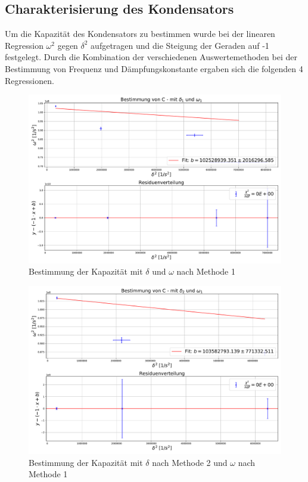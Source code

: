 \documentclass[a4paper, 11pt]{article}
\begin{document}
\subsection{Charakterisierung des Kondensators}
Um die Kapazität des Kondensators zu bestimmen wurde bei der linearen Regression $\omega^2$ gegen $\delta^2$ aufgetragen und die Steigung der Geraden auf -1 festgelegt. Durch die Kombination der verschiedenen Auswertemethoden bei der Bestimmung von Frequenz und Dämpfungskonstante ergaben sich die folgenden 4 Regressionen.

\begin{figure}[H]
	\centering
	\includegraphics[scale=0.4]{../Plots/BestimmungCdelta_1omega_1.pdf}
	\caption{Bestimmung der Kapazität mit $\delta$ und $\omega$ nach Methode 1}
	\label{fig:C11}
\end{figure}

\begin{figure}[H]
	\centering
	\includegraphics[scale=0.4]{../Plots/BestimmungCdelta_2omega_1.pdf}
	\caption{Bestimmung der Kapazität mit $\delta$ nach Methode 2 und $\omega$ nach Methode 1}
	\label{fig:C21}
\end{figure}
\end{document}
